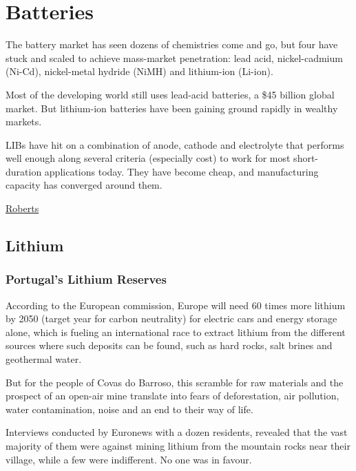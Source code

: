 \documentclass[
]{book}
\begin{document}
\hypertarget{batteries}{%
\chapter{Batteries}\label{batteries}}

The battery market has seen dozens of chemistries come and go, but four have stuck and scaled to achieve mass-market penetration: lead acid, nickel-cadmium (Ni-Cd), nickel-metal hydride (NiMH) and lithium-ion (Li-ion).

Most of the developing world still uses lead-acid batteries, a \$45 billion global market. But lithium-ion batteries have been gaining ground rapidly in wealthy markets.

LIBs have hit on a combination of anode, cathode and electrolyte that performs well enough along several criteria (especially cost) to work for most short-duration applications today. They have become cheap, and manufacturing capacity has converged around them.

\href{https://www.canarymedia.com/articles/the-basics-of-how-lithium-ion-batteries-work/}{Roberts}

\hypertarget{lithium}{%
\section{Lithium}\label{lithium}}

\hypertarget{portugals-lithium-reserves}{%
\subsection{Portugal's Lithium Reserves}\label{portugals-lithium-reserves}}

According to the European commission, Europe will need 60 times more lithium by 2050 (target year for carbon neutrality) for electric cars and energy storage alone, which is fueling an international race to extract lithium from the different sources where such deposits can be found, such as hard rocks, salt brines and geothermal water.

But for the people of Covas do Barroso, this scramble for raw materials and the prospect of an open-air mine translate into fears of deforestation, air pollution, water contamination, noise and an end to their way of life.

Interviews conducted by Euronews with a dozen residents, revealed that the vast majority of them were against mining lithium from the mountain rocks near their village, while a few were indifferent. No one was in favour.
\end{document}

